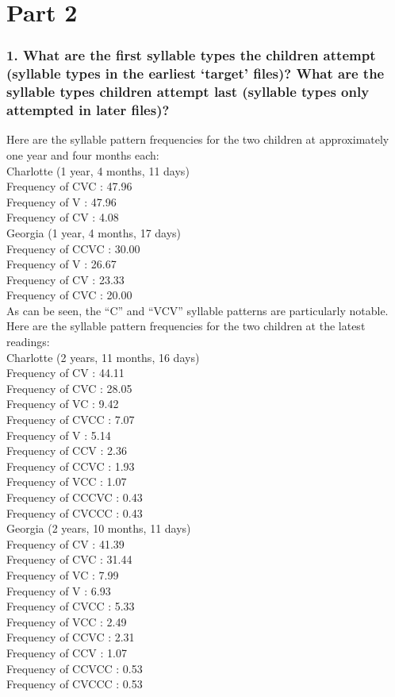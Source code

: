 \documentclass[a4paper,10pt]{article}
\newcommand{\br}{\\[10pt]}
\begin{document}
  \section*{Part 2}

  \subsubsection*{1. What are the first syllable types the children attempt (syllable types in the earliest ‘target’ files)? What are the syllable types children attempt last (syllable types only attempted in later files)?}
  Here are the syllable pattern frequencies for the two children at approximately one year and four months each:
  \br
  Charlotte (1 year, 4 months, 11 days)\\
  Frequency of CVC :        47.96\\
  Frequency of V :          47.96\\
  Frequency of CV :          4.08
  \br
  Georgia (1 year, 4 months, 17 days)\\
  Frequency of CCVC :       30.00\\
  Frequency of V :          26.67\\
  Frequency of CV :         23.33\\
  Frequency of CVC :        20.00
  \br
  As can be seen, the ``C'' and ``VCV'' syllable patterns are particularly notable.
  \br
  Here are the syllable pattern frequencies for the two children at the latest readings:
  \br
  Charlotte (2 years, 11 months, 16 days)\\
  Frequency of CV :         44.11\\
  Frequency of CVC :        28.05\\
  Frequency of VC :          9.42\\
  Frequency of CVCC :        7.07\\
  Frequency of V :           5.14\\
  Frequency of CCV :         2.36\\
  Frequency of CCVC :        1.93\\
  Frequency of VCC :         1.07\\
  Frequency of CCCVC :       0.43\\
  Frequency of CVCCC :       0.43
  \br
  Georgia (2 years, 10 months, 11 days)\\
  Frequency of CV :         41.39\\
  Frequency of CVC :        31.44\\
  Frequency of VC :          7.99\\
  Frequency of V :           6.93\\
  Frequency of CVCC :        5.33\\
  Frequency of VCC :         2.49\\
  Frequency of CCVC :        2.31\\
  Frequency of CCV :         1.07\\
  Frequency of CCVCC :       0.53\\
  Frequency of CVCCC :       0.53
\end{document}
